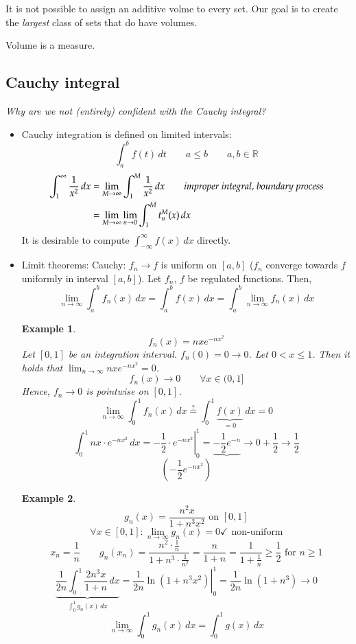 \documentclass{article}
\newtheorem{example}{Example}  \numberwithin{example}{section}
\begin{document}
It is not possible to assign an additive volme to every set.
Our goal is to create the \emph{largest} class of sets that do have volumes.

Volume is a measure.

\subsection{Cauchy integral}

\emph{Why are we not (entirely) confident with the Cauchy integral?}

\begin{itemize}
  \item Cauchy integration is defined on limited intervals:
    \[ \int_a^b f(t) \, dt \qquad a \leq b \qquad a,b \in \mathbb R \]
    \begin{align*}
      \int_1^\infty \frac{1}{x^2} \, dx
        &= \lim_{M\to\infty} \int_1^M \frac{1}{x^2} \, dx \qquad \text{\emph{improper integral, boundary process}} \\
        &= \lim_{M\to\infty} \lim_{n\to 0} \int_1^M t_n^M(x) \, dx
    \end{align*}
    It is desirable to compute $\int_{-\infty}^\infty f(x) \, dx$ directly.
  \item Limit theorems:
    Cauchy: $f_n \to f$ is uniform on $[a,b]$ ($f_n$ converge towards $f$ uniformly in interval $[a,b]$).
    Let $f_n$, $f$ be regulated functions. Then,
    \[ \lim_{n\to\infty} \int_a^b f_n(x) \, dx = \int_a^b f(x) \, dx = \int_a^b \lim_{n\to\infty} f_n(x) \, dx \]

    \begin{example}
      \[ f_n(x) = nxe^{-nx^2} \]
      Let $[0,1]$ be an integration interval. $f_n(0) = 0 \to 0$.
      Let $0 < x \leq 1$. Then it holds that $\lim_{n\to\infty} nxe^{-nx^2} = 0$.
      \[ f_n(x) \to 0 \qquad \forall x \in (0,1] \]
      Hence, $f_n \to 0$ is pointwise on $[0,1]$.
      \[ \lim_{n\to\infty} \int_0^1 f_n(x) \, dx \stackrel{?}{=} \int_0^1 \underbrace{f(x)}_{=0} \, dx = 0 \]
      \[ \int_0^1 nx \cdot e^{-nx^2} \, dx = \left.-\frac12 \cdot e^{-nx^2} \right|_0^1 = \underbrace{-\frac12 e^{-n}}{\to 0} + \frac12 \to \frac12 \]
      \[ \left(-\frac12 e^{-nx^2}\right) \]
    \end{example}

    \begin{example}
      \[ g_n(x) = \frac{n^2 x}{1 + n^3 x^2} \text{ on } [0,1] \]
      \[ \forall x \in [0,1]: \lim_{n\to\infty} g_n(x) = 0 \checkmark \text{ non-uniform} \] %
      \[ x_n = \frac1n \qquad g_n(x_n) = \frac{n^2 \cdot \frac1n}{1 + n^3 \cdot \frac{1}{n^2}} = \frac{n}{1+n} = \frac{1}{1 + \frac1n} \geq \frac12 \text{ for } n \geq 1 \]
      \[ \underbrace{\frac1{2n} \int_0^1 \frac{2 n^3 x}{1 + n} \, dx}_{\int_0^1 g_n(x) \, dx} = \left. \frac1{2n} \ln \left(1 + n^3 x^2\right) \right|_0^1 = \frac1{2n} \ln(1 + n^3) \to 0 \]
      \[ \lim_{n \to \infty} \int_0^1 g_n(x) \, dx = \int_0^1 g(x) \, dx \]
    \end{example}


\end{itemize}
\end{document}
